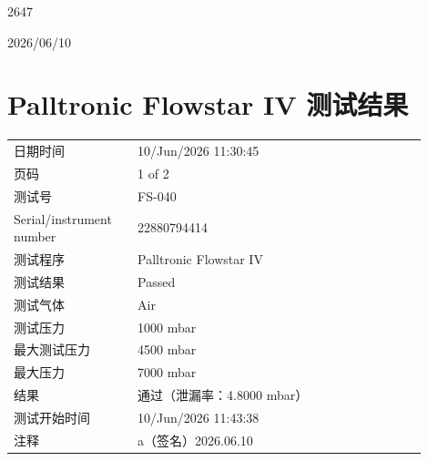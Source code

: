 \documentclass[UTF8,10pt,a4paper,fontset=fandol]{ctexart}
\newcommand{\fieldvalue}[1]{#1}
\newcommand{\handwritten}[1]{#1}
\begin{document}
\handwritten{2647}

\handwritten{2026/06/10}


\newpage

\section*{Palltronic Flowstar IV 测试结果}

\begin{tabular}{@{}p{0.27\linewidth}p{0.63\linewidth}@{}}
日期时间 &
\fieldvalue{10/Jun/2026 11:30:45}
\\
页码 &
\fieldvalue{1 of 2}
\\
测试号 &
\fieldvalue{FS-040}
\\
Serial/instrument number &
\fieldvalue{22880794414}
\\
测试程序 &
\fieldvalue{Palltronic Flowstar IV}
\\
测试结果 &
\fieldvalue{Passed}
\\
测试气体 &
\fieldvalue{Air}
\\
测试压力 &
\fieldvalue{1000 mbar}
\\
最大测试压力 &
\fieldvalue{4500 mbar}
\\
最大压力 &
\fieldvalue{7000 mbar}
\\
结果 &
\fieldvalue{通过（泄漏率：4.8000 mbar）}
\\
测试开始时间 &
\fieldvalue{10/Jun/2026 11:43:38}
\\
注释 &
\fieldvalue{\handwritten{a（签名）2026.06.10}}
\end{tabular}
\end{document}
